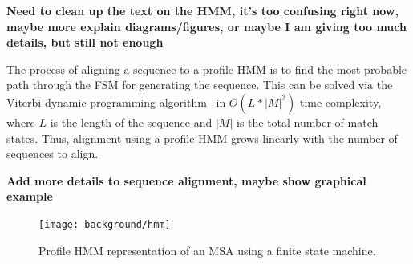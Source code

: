 \textbf{Need to clean up the text on the HMM, it's too confusing right now, maybe more explain diagrams/figures, or maybe I am giving too much details, but still not enough}

The process of aligning a sequence to a profile HMM is to find the most probable path through the FSM for generating the sequence.  This can be solved via the Viterbi dynamic programming algorithm~\cite{Viterbi1967} in $O(L*|M|^2)$ time complexity, where $L$ is the length of the sequence and $|M|$ is the total number of match states.  Thus, alignment using a profile HMM grows linearly with the number of sequences to align.

\textbf{Add more details to sequence alignment, maybe show graphical example}





\begin{figure}[htbp]
\centering
{\texttt{[image: background/hmm]}}
\caption[Profile HMM representation of an MSA.]{Profile HMM representation of an MSA using a finite state machine.}  
\label{back:hmm_model}
\end{figure}

